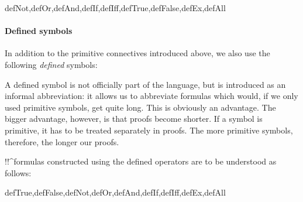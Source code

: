 \documentclass[../../../include/open-logic-section]{subfiles}
\begin{document}
\begin{tagblock}{defNot,defOr,defAnd,defIf,defIff,defTrue,defFalse,defEx,defAll}

\paragraph{Defined symbols}
In addition to the primitive connectives introduced
above, we also use the following \emph{defined} symbols:
\startycommalist

\begin{explain}
A defined symbol is not officially part of the language, but is
introduced as an informal abbreviation: it allows us to abbreviate
formulas which would, if we only used primitive symbols, get quite
long.  This is obviously an advantage.  The bigger advantage, however,
is that proofs become shorter.  If a symbol is primitive, it has to be
treated separately in proofs. The more primitive symbols, therefore,
the longer our proofs.
\end{explain}

\begin{defn}
!!^{formula}s constructed using the defined operators are to be understood
as follows:
\begin{tagenumerate}{defTrue,defFalse,defNot,defOr,defAnd,defIf,defIff,defEx,defAll}







\end{tagenumerate}
\end{defn}
\end{tagblock}
\end{document}
